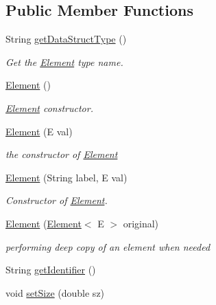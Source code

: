 \subsection*{Public Member Functions}
\begin{DoxyCompactItemize}
\item 
String \hyperlink{classbridges_1_1base_1_1_element_a6a1b70fa4b1936d10c6deb433acf8cd9}{get\+Data\+Struct\+Type} ()
\begin{DoxyCompactList}\small\item\em Get the \hyperlink{classbridges_1_1base_1_1_element}{Element} type name. \end{DoxyCompactList}\item 
\hyperlink{classbridges_1_1base_1_1_element_aa5fc5728f2ed4b041118a77409442390}{Element} ()
\begin{DoxyCompactList}\small\item\em \hyperlink{classbridges_1_1base_1_1_element}{Element} constructor. \end{DoxyCompactList}\item 
\hyperlink{classbridges_1_1base_1_1_element_a6cb9b3b85b923602aad5c1be6696d825}{Element} (E val)
\begin{DoxyCompactList}\small\item\em the constructor of \hyperlink{classbridges_1_1base_1_1_element}{Element} \end{DoxyCompactList}\item 
\hyperlink{classbridges_1_1base_1_1_element_a14e857e8050eac518900a458f0364d8e}{Element} (String label, E val)
\begin{DoxyCompactList}\small\item\em Constructor of \hyperlink{classbridges_1_1base_1_1_element}{Element}. \end{DoxyCompactList}\item 
\hyperlink{classbridges_1_1base_1_1_element_a91db9de70b65a1d7b5f27c1c0b909832}{Element} (\hyperlink{classbridges_1_1base_1_1_element}{Element}$<$ E $>$ original)
\begin{DoxyCompactList}\small\item\em performing deep copy of an element when needed \end{DoxyCompactList}\item 
String \hyperlink{classbridges_1_1base_1_1_element_ad5496f568b4cca3909800eceea5fb47d}{get\+Identifier} ()
\item 
void \hyperlink{classbridges_1_1base_1_1_element_a57153c203d8d2790650edb14ad61c338}{set\+Size} (double sz)

\end{DoxyCompactItemize}
